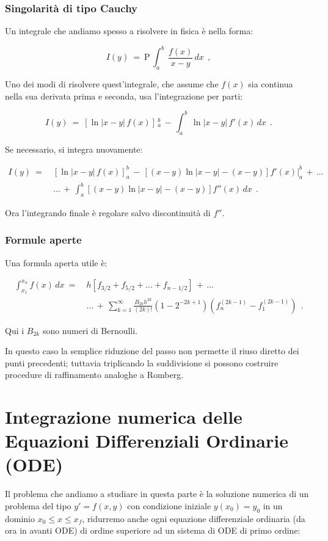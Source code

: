 \documentclass{article}
\begin{document}
	\subsubsection{Singolarità di tipo Cauchy}
	
	Un integrale che andiamo spesso a risolvere in fisica è nella forma:
	
	\[ I(y)\ =\ \mathrm{P}\,\int_a^b\, \frac{f(x)}{x-y}\, dx\ \ ,\]
	
	Uno dei modi di risolvere quest'integrale, che assume che $f(x)$ sia continua nella sua derivata prima e seconda, usa l'integrazione per parti:
	
	\[ I(y)\ =\
	\left[\ln|x-y|\,f(x)\right]\,_a^b\,
	-\,
	\int_a^b\, \ln|x-y|\,f'(x)\,dx\ \ .
	\]
	
	Se necessario, si integra nuovamente:
	
	\[\begin{aligned}
	I(y)\ =\
	&\left[\ln|x-y|\,f(x)\right]_a^b
	\, -\,
	\left[(x-y)\ln|x-y|-(x-y)\right]f'(x)\Big|_a^b
	\, +\, \dots\\
	&\dots \, +\, \int_a^b [(x-y)\ln|x-y|-(x-y)] f''(x)\,dx\ \ .
	\end{aligned}\]
	
	Ora l'integrando finale è regolare salvo discontinuità di $f''$.
	
	\subsubsection{Formule aperte}
	
	Una formula aperta utile è:
	
	\[\begin{aligned}
	\int_{x_1}^{x_n} f(x)\,dx
	\ =\ 
	&h\left[
	f_{3/2}+f_{5/2}+\dots+f_{n-1/2}
	\right]
	\, +\, \dots\\
	&\dots \, +\, \sum_{k=1}^{\infty}
	\frac{B_{2k} h^{2k}}{(2k)!}
	\left(1-2^{-2k+1}\right)
	\left(f^{(2k-1)}_n - f^{(2k-1)}_1\right)\ \ .\end{aligned}
	\]
	
	Qui i $B_{2k}$ sono numeri di Bernoulli.
	
	In questo caso la semplice riduzione del passo non permette il riuso diretto dei punti precedenti; tuttavia triplicando la suddivisione si possono costruire procedure di raffinamento analoghe a Romberg.
	
	
	
	\newpage
	\section{Integrazione numerica delle Equazioni Differenziali Ordinarie (ODE)}
	Il problema che andiamo a studiare in questa parte è la soluzione numerica di un problema del tipo $\boxed{y'=f(x, y)}$ con condizione iniziale $y(x_0)=y_0$ in un dominio $x_0\leq x \leq x_f$, ridurremo anche ogni equazione differenziale ordinaria (da ora in avanti ODE) di ordine superiore ad un sistema di ODE di primo ordine:
	
\end{document}
